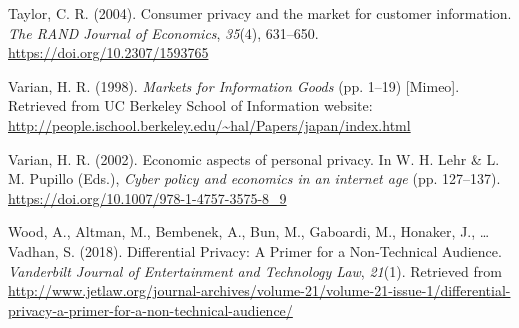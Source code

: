 \documentclass[]{article}
\begin{document}
\hypertarget{ref-Taylor:Consumer:RAND:2004}{}
Taylor, C. R. (2004). Consumer privacy and the market for customer
information. \emph{The RAND Journal of Economics}, \emph{35}(4),
631--650. \url{https://doi.org/10.2307/1593765}

\hypertarget{ref-Varian1998}{}
Varian, H. R. (1998). \emph{Markets for Information Goods} (pp. 1--19)
{[}Mimeo{]}. Retrieved from UC Berkeley School of Information website:
\url{http://people.ischool.berkeley.edu/~hal/Papers/japan/index.html}

\hypertarget{ref-Varian2002}{}
Varian, H. R. (2002). Economic aspects of personal privacy. In W. H.
Lehr \& L. M. Pupillo (Eds.), \emph{Cyber policy and economics in an
internet age} (pp. 127--137).
\url{https://doi.org/10.1007/978-1-4757-3575-8_9}

\hypertarget{ref-WoodVanderbiltJ.Entertain.Technol.Law2018}{}
Wood, A., Altman, M., Bembenek, A., Bun, M., Gaboardi, M., Honaker, J.,
\ldots{} Vadhan, S. (2018). Differential Privacy: A Primer for a
Non-Technical Audience. \emph{Vanderbilt Journal of Entertainment and
Technology Law}, \emph{21}(1). Retrieved from
\url{http://www.jetlaw.org/journal-archives/volume-21/volume-21-issue-1/differential-privacy-a-primer-for-a-non-technical-audience/}
\end{document}
